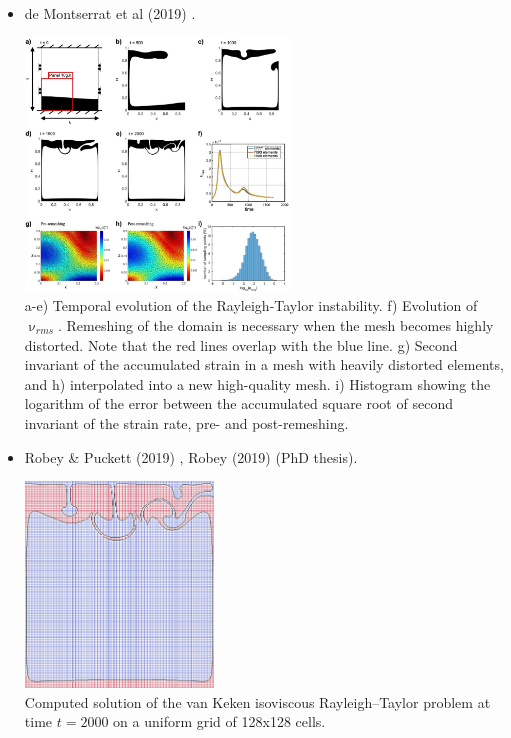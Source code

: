 \begin{itemize}
\item de Montserrat et al (2019) \cite{demh19}.


\begin{center}
\includegraphics[width=7cm]{images/benchmark_vaks97/demh19}\\
{\captionfont 
a-e) Temporal evolution of the Rayleigh-Taylor instability. 
f) Evolution of $\upnu_{rms}$. 
Remeshing of the domain is necessary when the mesh becomes highly distorted. 
Note that the red lines overlap with the blue line. 
g) Second invariant of the accumulated strain in a mesh with heavily distorted elements, 
and h) interpolated into a new high-quality mesh. 
i) Histogram showing the logarithm of the error between the accumulated square root of 
second invariant of the strain rate, pre- and post-remeshing.}
\end{center}


\item Robey \& Puckett (2019) \cite{ropu19}, Robey (2019) \cite{robe19} (PhD thesis).

\begin{center}
\includegraphics[width=5cm]{images/benchmark_vaks97/ropu19}\\
{\captionfont Computed solution of the van Keken isoviscous Rayleigh–Taylor problem
at time $t = 2000$ on a uniform grid of 128x128 cells. }
\end{center}




\end{itemize}
